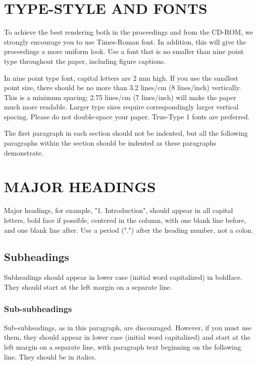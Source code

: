 \documentclass{article}
\begin{document}
\section{TYPE-STYLE AND FONTS}
\label{sec:typestyle}

To achieve the best rendering both in the proceedings and from the CD-ROM, we
strongly encourage you to use Times-Roman font.  In addition, this will give
the proceedings a more uniform look.  Use a font that is no smaller than nine
point type throughout the paper, including figure captions.

In nine point type font, capital letters are 2 mm high.  If you use the
smallest point size, there should be no more than 3.2 lines/cm (8 lines/inch)
vertically.  This is a minimum spacing; 2.75 lines/cm (7 lines/inch) will make
the paper much more readable.  Larger type sizes require correspondingly larger
vertical spacing.  Please do not double-space your paper.  True-Type 1 fonts
are preferred.

The first paragraph in each section should not be indented, but all the
following paragraphs within the section should be indented as these paragraphs
demonstrate.

\section{MAJOR HEADINGS}
\label{sec:majhead}

Major headings, for example, "1. Introduction", should appear in all capital
letters, bold face if possible, centered in the column, with one blank line
before, and one blank line after. Use a period (".") after the heading number,
not a colon.

\subsection{Subheadings}
\label{ssec:subhead}

Subheadings should appear in lower case (initial word capitalized) in
boldface.  They should start at the left margin on a separate line.
 
\subsubsection{Sub-subheadings}
\label{sssec:subsubhead}

Sub-subheadings, as in this paragraph, are discouraged. However, if you
must use them, they should appear in lower case (initial word
capitalized) and start at the left margin on a separate line, with paragraph
text beginning on the following line.  They should be in italics.
\end{document}
